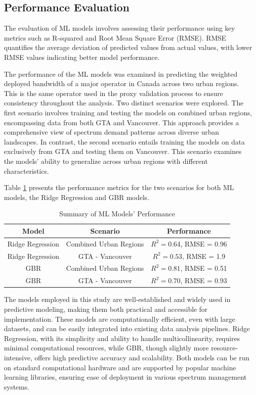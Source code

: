\documentclass[conference]{IEEEtran}
\begin{document}
\subsection{Performance Evaluation} %

The evaluation of ML models involves assessing their performance using key metrics such as R-squared and Root Mean Square Error (RMSE). RMSE quantifies the average deviation of predicted values from actual values, with lower RMSE values indicating better model performance.

The performance of the ML models was examined in predicting the weighted deployed bandwidth of a major operator in Canada across two urban regions. This is the same operator used in the proxy validation process to ensure consistency throughout the analysis. Two distinct scenarios were explored. The first scenario involves training and testing the models on combined urban regions, encompassing data from both GTA and Vancouver. This approach provides a comprehensive view of spectrum demand patterns across diverse urban landscapes. In contrast, the second scenario entails training the models on data exclusively from GTA and testing them on Vancouver. This scenario examines the models' ability to generalize across urban regions with different characteristics.

Table \ref{tab:model_performance} presents the performance metrics for the two scenarios for both ML models, the Ridge Regression and GBR models.

\begin{table}[h]
\centering
\caption{Summary of ML Models' Performance}
\label{tab:model_performance}
\begin{tabular}{@{}ccc@{}}
\toprule
\textbf{Model} & \textbf{Scenario} & \textbf{Performance} \\ \midrule
Ridge Regression & Combined Urban Regions & $R^2 = 0.64$, RMSE = 0.96 \\
Ridge Regression & GTA - Vancouver & $R^2 = 0.53$, RMSE = 1.9 \\
GBR & Combined Urban Regions & $R^2 = 0.81$, RMSE = 0.51 \\
GBR & GTA - Vancouver & $R^2 = 0.70$, RMSE = 0.93 \\ \bottomrule
\end{tabular}
\end{table}

The models employed in this study are well-established and widely used in predictive modeling, making them both practical and accessible for implementation. These models are computationally efficient, even with large datasets, and can be easily integrated into existing data analysis pipelines. Ridge Regression, with its simplicity and ability to handle multicollinearity, requires minimal computational resources, while GBR, though slightly more resource-intensive, offers high predictive accuracy and scalability. Both models can be run on standard computational hardware and are supported by popular machine learning libraries, ensuring ease of deployment in various spectrum management systems.
\end{document}
